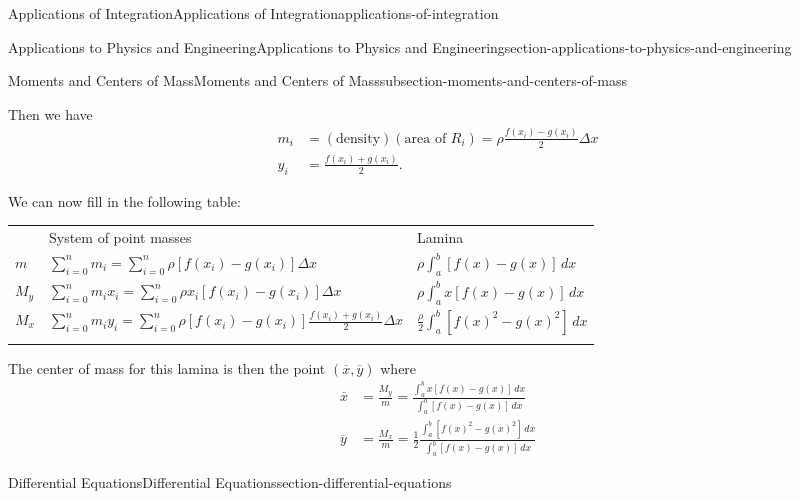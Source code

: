 \documentclass[oneside,10pt,]{book}
\numberwithin{equation}{section}
\newcommand{\hrulethick} {\noalign{\hrule height 0.11em}}
\newcommand{\amp}{&}
\begin{document}
\begin{chapterptx}{Applications of Integration}{}{Applications of Integration}{}{}{applications-of-integration}
\begin{sectionptx}{Applications to Physics and Engineering}{}{Applications to Physics and Engineering}{}{}{section-applications-to-physics-and-engineering}
\begin{subsectionptx}{Moments and Centers of Mass}{}{Moments and Centers of Mass}{}{}{subsection-moments-and-centers-of-mass}
\begin{figure}
{
}
\end{figure}
\hypertarget{p-712}{}%
Then we have%
\begin{align*}
m_{i} \amp= (\text{density})(\text{area of }R_{i}) = \rho\frac{f(x_{i})-g(x_{i})}{2}\Delta x\\
y_{i} \amp= \frac{f(x_{i})+g(x_{i})}{2}.
\end{align*}
%
\par
\hypertarget{p-713}{}%
We can now fill in the following table:%
\begin{table}
\centering
\begin{tabular}{lll}\hrulethick
&System of point masses&Lamina\tabularnewline\hrulethick
\(m\)&\(\sum_{i=0}^{n}m_{i} = \sum_{i=0}^{n}\rho[f(x_{i})-g(x_{i})]\Delta x\)&\(\rho\int_{a}^{b}[f(x)-g(x)]\,dx\)\tabularnewline[0pt]
\(M_{y}\)&\(\sum_{i=0}^{n}m_{i}x_{i} = \sum_{i=0}^{n}\rho x_{i}[f(x_{i})-g(x_{i})]\Delta x\)&\(\rho\int_{a}^{b}x[f(x)-g(x)]\,dx\)\tabularnewline[0pt]
\(M_{x}\)&\(\sum_{i=0}^{n}m_{i}y_{i} = \sum_{i=0}^{n}\rho[f(x_{i})-g(x_{i})]\frac{f(x_{i})+g(x_{i})}{2}\Delta x\)&\(\frac{\rho}{2}\int_{a}^{b}[f(x)^{2}-g(x)^{2}]\,dx\)\tabularnewline\hrulethick
\end{tabular}
\end{table}
\hypertarget{p-714}{}%
The center of mass for this lamina is then the point \((\overline{x},\overline{y})\) where%
\begin{align*}
\overline{x} \amp= \frac{M_{y}}{m} = \frac{\int_{a}^{b}x[f(x)-g(x)]\,dx}{\int_{a}^{b}[f(x)-g(x)]\,dx}\\
\overline{y} \amp= \frac{M_{x}}{m} = \frac{1}{2}\frac{\int_{a}^{b}[f(x)^{2}-g(x)^{2}]\,dx}{\int_{a}^{b}[f(x)-g(x)]\,dx}
\end{align*}
%
\end{subsectionptx}
\end{sectionptx}
%
%
\typeout{************************************************}
\typeout{************************************************}
%
\begin{sectionptx}{Differential Equations}{}{Differential Equations}{}{}{section-differential-equations}

\end{sectionptx}
\end{chapterptx}
\end{document}
